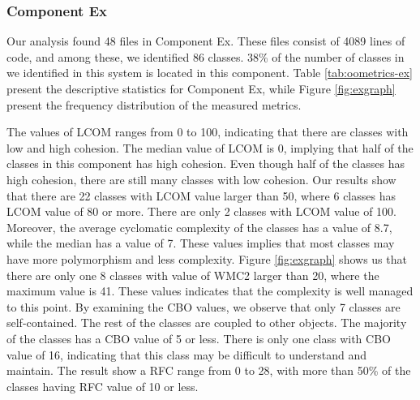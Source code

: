 \subsubsection{Component Ex}
Our analysis found 48 files in Component Ex. These files consist of 4089 lines of code, and among these, we identified 86 classes. 38\% of the number of classes in we identified in this system is located in this component. Table \ref{tab:oometrics-ex} present the descriptive statistics for Component Ex, while Figure \ref{fig:exgraph} present the frequency distribution of the measured metrics. 

The values of LCOM ranges from 0 to 100, indicating that there are classes with low and high cohesion. The median value of LCOM is 0, implying that half of the classes in this component has high cohesion.  Even though half of the classes has high cohesion, there are still many classes with low cohesion. Our results show that there are 22 classes with LCOM value larger than 50, where 6 classes has LCOM value of 80 or more. There are only 2 classes with LCOM value of 100. Moreover, the average cyclomatic complexity of the classes has a value of 8.7, while the median has a value of 7. These values implies that most classes may have more polymorphism and less complexity. Figure \ref{fig:exgraph} shows us that there are only one 8 classes with value of WMC2 larger than 20, where the maximum value is 41. These values indicates that the complexity is well managed to this point. By examining the CBO values, we observe that only 7 classes are self-contained. The rest of the classes are coupled to other objects. The majority of the classes has a CBO value of 5 or less. There is only one class with CBO value of 16, indicating that this class may be difficult to understand and maintain. The result show a RFC range from 0 to 28, with more than 50\% of the classes having RFC value of 10 or less.

